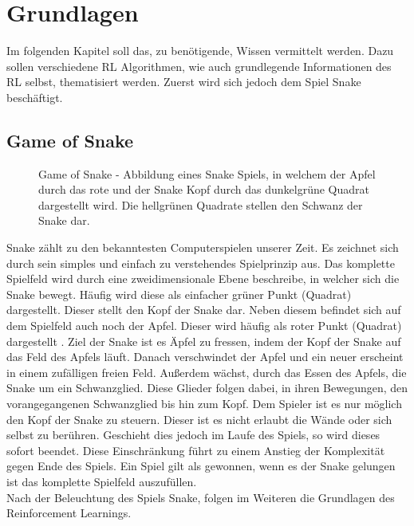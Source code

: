 
\chapter{Grundlagen}\label{chap:Grundlagen}
Im folgenden Kapitel soll das, zu benötigende, Wissen vermittelt werden. Dazu sollen verschiedene RL Algorithmen, wie auch grundlegende Informationen des RL selbst, thematisiert werden. Zuerst wird sich jedoch dem Spiel Snake beschäftigt. 

\section{Game of Snake} \label{sec:Grundlagen_Game_of_Snake}
\begin{figure}[H]
	\centering
	
	\caption[Game of Snake]{Game of Snake - Abbildung eines Snake Spiels, in welchem der Apfel durch das rote und der Snake Kopf durch das dunkelgrüne Quadrat dargestellt wird. Die hellgrünen Quadrate stellen den Schwanz der Snake dar.}
	\label{fig:Grundlagen_Game_of_Snake}
\end{figure}
Snake zählt zu den bekanntesten Computerspielen unserer Zeit. Es zeichnet sich durch sein simples und einfach zu verstehendes Spielprinzip aus.
Das komplette Spielfeld wird durch eine zweidimensionale Ebene beschreibe, in welcher sich die Snake bewegt. Häufig wird diese als einfacher grüner Punkt (Quadrat) dargestellt. Dieser stellt den Kopf der Snake dar. Neben diesem befindet sich auf dem Spielfeld auch noch der Apfel. Dieser wird häufig als roter Punkt (Quadrat) dargestellt .
Ziel der Snake ist es Äpfel zu fressen, indem der Kopf der Snake auf das Feld des Apfels läuft. Danach verschwindet der Apfel und ein neuer erscheint in einem zufälligen freien Feld. Außerdem wächst, durch das Essen des Apfels, die Snake um ein Schwanzglied. Diese Glieder folgen dabei, in ihren Bewegungen, den vorangegangenen Schwanzglied bis hin zum Kopf. Dem Spieler ist es nur möglich den Kopf der Snake zu steuern.
Dieser ist es nicht erlaubt die Wände oder sich selbst zu berühren. Geschieht dies jedoch im Laufe des Spiels, so wird dieses sofort beendet. Diese Einschränkung führt zu einem Anstieg der Komplexität gegen Ende des Spiels. 
Ein Spiel gilt als gewonnen, wenn es der Snake gelungen ist das komplette Spielfeld auszufüllen.\\
Nach der Beleuchtung des Spiels Snake, folgen im Weiteren die Grundlagen des Reinforcement Learnings.

